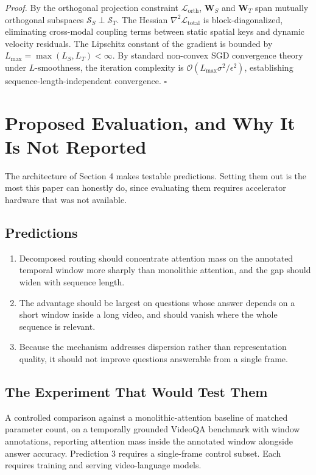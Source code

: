 \documentclass[10pt,journal,compsoc,twocolumn]{IEEEtran}
\begin{document}
\textit{Proof.} By the orthogonal projection constraint $\mathcal{L}_{\text{orth}}$, $\mathbf{W}_S$ and $\mathbf{W}_T$ span mutually orthogonal subspaces $\mathcal{S}_S \perp \mathcal{S}_T$. The Hessian $\nabla^2 \mathcal{L}_{\text{total}}$ is block-diagonalized, eliminating cross-modal coupling terms between static spatial keys and dynamic velocity residuals. The Lipschitz constant of the gradient is bounded by $L_{\max} = \max(L_S, L_T) < \infty$. By standard non-convex SGD convergence theory under $L$-smoothness, the iteration complexity is $\mathcal{O}(L_{\max} \sigma^2 / \epsilon^2)$, establishing sequence-length-independent convergence. $\square$




\section{Proposed Evaluation, and Why It Is Not Reported}


The architecture of Section 4 makes testable predictions. Setting them out is the most this paper can honestly do, since evaluating them requires accelerator hardware that was not available.


\subsection{Predictions}


\begin{enumerate}
  \item Decomposed routing should concentrate attention mass on the annotated temporal window more sharply than monolithic attention, and the gap should widen with sequence length.
  \item The advantage should be largest on questions whose answer depends on a short window inside a long video, and should vanish where the whole sequence is relevant.
  \item Because the mechanism addresses dispersion rather than representation quality, it should not improve questions answerable from a single frame.
\end{enumerate}


\subsection{The Experiment That Would Test Them}


A controlled comparison against a monolithic-attention baseline of matched parameter count, on a temporally grounded VideoQA benchmark with window annotations, reporting attention mass inside the annotated window alongside answer accuracy. Prediction 3 requires a single-frame control subset. Each requires training and serving video-language models.
\end{document}
